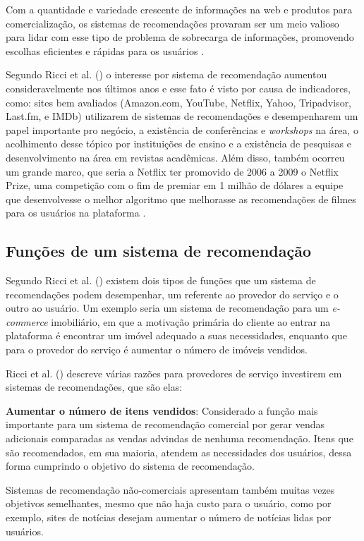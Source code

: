Com a quantidade e variedade crescente de informações na web e produtos para comercialização, os sistemas de recomendações provaram ser um meio valioso para lidar com esse tipo de problema de sobrecarga de informações, promovendo escolhas eficientes e rápidas para os usuários \cite{Ricci:2010}.

Segundo Ricci et al. (\citeyear{Ricci:2010}) o interesse por sistema de recomendação aumentou consideravelmente nos últimos anos e esse fato é visto por causa de  indicadores, como: sites bem avaliados (Amazon.com, YouTube, Netflix, Yahoo, Tripadvisor, Last.fm, e IMDb) utilizarem de sistemas de recomendações e desempenharem um papel importante pro negócio, a existência de conferências e \textit{workshops} na área, o acolhimento desse tópico por instituições de ensino e a existência de pesquisas e desenvolvimento na área em revistas acadêmicas. Além disso, também ocorreu um grande marco, que seria a Netflix ter promovido de 2006 a 2009 o Netflix Prize, uma competição com o fim de premiar em 1 milhão de dólares a equipe que desenvolvesse o melhor algoritmo que melhorasse as recomendações de filmes para os usuários na plataforma \cite{netflixprize:2009}.

\subsection{Funções de um sistema de recomendação}

Segundo Ricci et al. (\citeyear{Ricci:2010}) existem dois tipos de funções que um sistema de recomendações podem desempenhar, um referente ao provedor do serviço e o outro ao usuário. Um exemplo seria um sistema de recomendação para um \textit{e-commerce} imobiliário, em que a motivação primária do cliente ao entrar na plataforma é encontrar um imóvel adequado a suas necessidades, enquanto que para o provedor do serviço é aumentar o número de imóveis vendidos.

Ricci et al. (\citeyear{Ricci:2010}) descreve várias razões para provedores de serviço investirem em sistemas de recomendações, que são elas:

\textbf{Aumentar o número de itens vendidos}: Considerado a função mais importante para um sistema de recomendação comercial por gerar vendas adicionais comparadas as vendas advindas de nenhuma recomendação. Itens que são recomendados, em sua maioria, atendem as necessidades dos usuários, dessa forma cumprindo o objetivo do sistema de recomendação.

Sistemas de recomendação não-comerciais apresentam também muitas vezes objetivos semelhantes, mesmo que não haja custo para o usuário, como por exemplo, sites de notícias desejam aumentar o número de notícias lidas por usuários.

